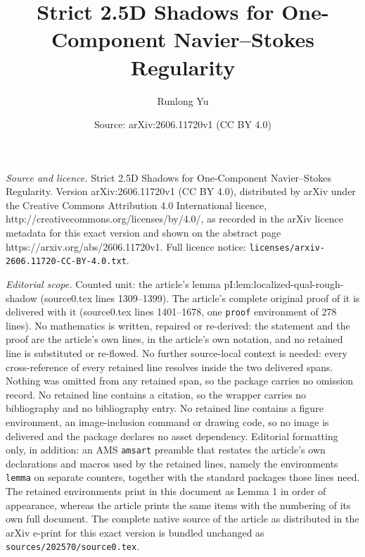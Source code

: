 \documentclass[10pt,a4paper]{amsart}
\title{Strict 2.5D Shadows for One-Component Navier--Stokes Regularity}
\author{Runlong Yu}
\date{Source: arXiv:2606.11720v1 (CC BY 4.0)}
\begin{document}
\maketitle

\noindent\emph{Source and licence.} Strict 2.5D Shadows for One-Component Navier--Stokes Regularity. Version arXiv:2606.11720v1 (CC BY 4.0), distributed by arXiv under the Creative Commons Attribution 4.0 International licence, http://creativecommons.org/licenses/by/4.0/, as recorded in the arXiv licence metadata for this exact version and shown on the abstract page https://arxiv.org/abs/2606.11720v1. Full licence notice: \texttt{licenses/arxiv-2606.11720-CC-BY-4.0.txt}.\par\smallskip

\noindent\textit{Editorial scope.} Counted unit: the article's lemma pI:lem:localized-qual-rough-shadow (source0.tex lines 1309--1399). The article's complete original proof of it is delivered with it (source0.tex lines 1401--1678, one \texttt{proof} environment of 278 lines). No mathematics is written, repaired or re-derived: the statement and the proof are the article's own lines, in the article's own notation, and no retained line is substituted or re-flowed.  No further source-local context is needed: every cross-reference of every retained line resolves inside the two delivered spans.  Nothing was omitted from any retained span, so the package carries no omission record.  No retained line contains a citation, so the wrapper carries no bibliography and no bibliography entry.  No retained line contains a figure environment, an image-inclusion command or drawing code, so no image is delivered and the package declares no asset dependency.  Editorial formatting only, in addition: an AMS \texttt{amsart} preamble that restates the article's own declarations and macros used by the retained lines, namely the environments \texttt{lemma} on separate counters, together with the standard packages those lines need.  The retained environments print in this document as Lemma 1 in order of appearance, whereas the article prints the same items with the numbering of its own full document.  The complete native source of the article as distributed in the arXiv e-print for this exact version is bundled unchanged as \texttt{sources/202570/source0.tex}.
\end{document}
